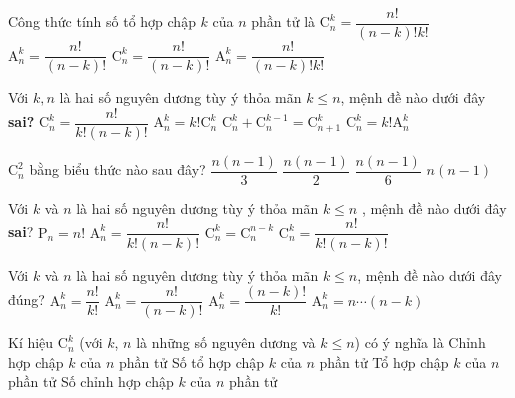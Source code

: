 \begin{ex}%
	Công thức tính số tổ hợp chập $k$ của $n$ phần tử là 
	\choice
	{\True$\mathrm{C}_n^k=\dfrac{n!}{(n-k)!k!}$}
	{$\mathrm{A}_n^k=\dfrac{n!}{(n-k)!}$}
	{$\mathrm{C}_n^k=\dfrac{n!}{(n-k)!}$}
	{$\mathrm{A}_n^k=\dfrac{n!}{(n-k)!k!}$}
\end{ex}%
\begin{ex}%
Với $k,n$ là hai số nguyên dương tùy ý thỏa mãn $k\leq n$, mệnh đề nào dưới đây \textbf{sai?}
\choice
{$\mathrm{C}_n^k=\dfrac{n!}{k!(n-k)!}$}
{$\mathrm{A}_n^k=k!\mathrm{C}_n^k$}
{$\mathrm{C}_n^k+\mathrm{C}_n^{k-1}=\mathrm{C}_{n+1}^k$}
{\True $\mathrm{C}_n^k=k!\mathrm{A}_n^k$}
\end{ex}%
\begin{ex}%
	$\mathrm{C}_n^2$ bằng biểu thức nào sau đây?
	\choice
	{$\dfrac{n(n-1)}{3}$}
	{\True $\dfrac{n(n-1)}{2}$}
	{$\dfrac{n(n-1)}{6}$}
	{$n(n-1)$}
\end{ex}%
\begin{ex}%
Với $k$ và $n$ là hai số nguyên dương tùy ý thỏa mãn $k \leqslant  n$ , mệnh đề nào dưới đây \textbf{sai}?
\choice
{$\mathrm{P}_n =n!$}
{\True $\mathrm{A}_n^k = \dfrac{n!}{k!(n-k)!}$}
{$\mathrm{C}_n^k=\mathrm{C}_n^{n-k}$}
{$\mathrm{C}_n^k = \dfrac{n!}{k!(n-k)!}$}
\end{ex}%
\begin{ex}%
	Với $k$ và $n$ là hai số nguyên dương tùy ý thỏa mãn $k\leq n$, mệnh đề nào dưới đây đúng?
	\choice
	{$\mathrm{A}_n^k=\dfrac{n!}{k!}$}
	{\True $\mathrm{A}_n^k=\dfrac{n!}{(n-k)!}$}
	{$\mathrm{A}_n^k=\dfrac{(n-k)!}{k!}$}
	{$\mathrm{A}_n^k=n\cdots(n-k)$}
\end{ex}%
\begin{ex}%
Kí hiệu $\mathrm{C}_n^k$ (với $k$, $n$ là những số nguyên dương và $k\leq n$) có ý nghĩa là
\choice
{Chỉnh hợp chập $k$ của $n$ phần tử}
{\True Số tổ hợp chập $k$ của $n$ phần tử}
{Tổ hợp chập $k$ của $n$ phần tử}
{Số chỉnh hợp chập $k$ của $n$ phần tử}
\end{ex}%
